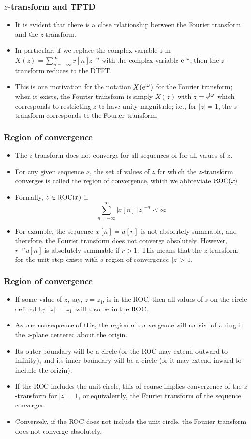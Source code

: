 \begin{frame}
\frametitle{$z$-transform and TFTD}
\begin{itemize}
\item It is evident  that there is a close relationship between the Fourier transform and the $z$-transform. 
\item In particular, if we replace the complex variable $z$ in $X(z)= \sum_{n=-\infty}^{\infty} x[n] z^{-n}$ with the complex variable $\mathrm{e}^{\mathrm{i}\omega}$, then the $z$-transform reduces to the DTFT. 
\item This is one motivation for the notation $X(\mathrm{e}^{\mathrm{i} \omega})$ for the Fourier transform; when it exists, the Fourier transform is simply $X(z)$ with $z=\mathrm{e}^{\mathrm{i} \omega}$ which  corresponds to restricting $z$ to have unity magnitude; i.e., for $|z| =1$, the $z$-transform corresponds to the Fourier transform. 
\end{itemize}
\end{frame}

\begin{frame}
\frametitle{Region of convergence}
\begin{itemize}
\item The $z$-transform does not converge for all sequences or for all values of $z$. 
\item For any given sequence $x$, the set of values of $z$ for which the $z$-transform converges is called the \alert{region of convergence}, which we abbreviate \alert{$\mathrm{ROC}(x)$}.
\item Formally, $z \in \mathrm{ROC}(x)$ if 
$$
\sum_{n=-\infty}^{\infty}|x[n]| |z|^{-n}<\infty
$$
\item For example, the sequence $x[n]=u[n]$ is not absolutely summable, and therefore, the Fourier transform does not converge absolutely. However, $r^{-n}u[n]$ is absolutely summable if $r>1$. This means that the $z$-transform for the unit step exists with a region of convergence $|z|>1$.
\end{itemize}
\end{frame}

\begin{frame}
\frametitle{Region of convergence}
\begin{itemize}
\item If some value of $z$, say, $z=z_{1}$, is in the ROC, then all values of $z$ on the circle defined by $|z|=|z_{1}|$ will also be in the ROC. 
\item  As one consequence of this, the region of convergence will consist of a ring in the $z$-plane centered about the origin.
\item  Its outer boundary will be a circle (or the ROC may extend outward to infinity), and its inner boundary will be a circle (or it may extend inward to include the origin). 
\item If the ROC includes the unit circle, this of course implies convergence of the $z$-transform for $|z|=1$, or equivalently, the Fourier transform of the sequence converges. 
\item Conversely, if the ROC does not include the unit circle, the Fourier transform does not converge absolutely.
\end{itemize}
\end{frame}

